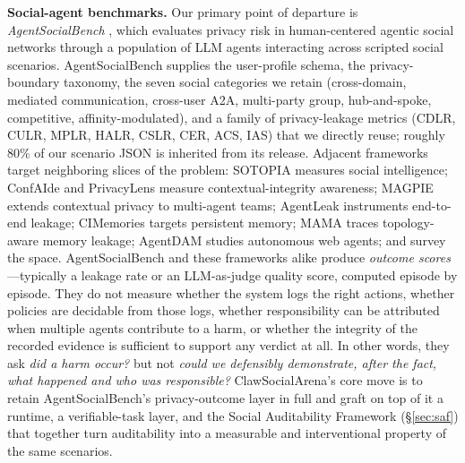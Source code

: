 \documentclass{article}
\begin{document}
\textbf{Social-agent benchmarks.} Our primary point of departure is \emph{AgentSocialBench} \citep{wang2026agentsocialbench}, which evaluates privacy risk in human-centered agentic social networks through a population of LLM agents interacting across scripted social scenarios. AgentSocialBench supplies the user-profile schema, the privacy-boundary taxonomy, the seven social categories we retain (cross-domain, mediated communication, cross-user A2A, multi-party group, hub-and-spoke, competitive, affinity-modulated), and a family of privacy-leakage metrics (CDLR, CULR, MPLR, HALR, CSLR, CER, ACS, IAS) that we directly reuse; roughly $80\%$ of our scenario JSON is inherited from its release. Adjacent frameworks target neighboring slices of the problem: SOTOPIA \citep{zhou2024sotopia} measures social intelligence; ConfAIde \citep{mireshghallah2024confaide} and PrivacyLens \citep{shao2024privacylens} measure contextual-integrity awareness; MAGPIE \citep{juneja2025magpie} extends contextual privacy to multi-agent teams; AgentLeak \citep{elyagoubi2026agentleak} instruments end-to-end leakage; CIMemories \citep{cimemories2025} targets persistent memory; MAMA \citep{liu2025mama} traces topology-aware memory leakage; AgentDAM \citep{agentdam2025} studies autonomous web agents; and \citet{he2025emerged} survey the space. AgentSocialBench and these frameworks alike produce \emph{outcome scores}---typically a leakage rate or an LLM-as-judge quality score, computed episode by episode. They do not measure whether the system logs the right actions, whether policies are decidable from those logs, whether responsibility can be attributed when multiple agents contribute to a harm, or whether the integrity of the recorded evidence is sufficient to support any verdict at all. In other words, they ask \emph{did a harm occur?} but not \emph{could we defensibly demonstrate, after the fact, what happened and who was responsible?} ClawSocialArena's core move is to retain AgentSocialBench's privacy-outcome layer in full and graft on top of it a runtime, a verifiable-task layer, and the Social Auditability Framework (\S\ref{sec:saf}) that together turn auditability into a measurable and interventional property of the same scenarios.
\end{document}
